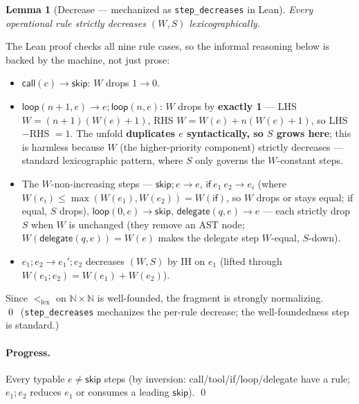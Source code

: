\documentclass[11pt]{article}
\theoremstyle{plain}
\newtheorem*{lemmaU}{Lemma}
\newcommand{\kw}[1]{\mathsf{#1}}                      %
\begin{document}
\begin{lemmaU}[Decrease --- mechanized as \texttt{step\_decreases} in Lean]
Every operational rule strictly decreases $(W, S)$ lexicographically.
\end{lemmaU}

The Lean proof checks all nine rule cases, so the informal reasoning below is backed by the
machine, not just prose:
\begin{itemize}
\item $\kw{call}(c) \to \kw{skip}$: $W$ drops $1 \to 0$.
\item $\kw{loop}(n+1, e) \to e ; \kw{loop}(n, e)$: $W$ drops by \textbf{exactly 1} --- LHS
  $W = (n+1)(W(e) + 1)$, RHS $W = W(e) + n (W(e) + 1)$, so LHS$-$RHS $= 1$. The unfold
  \textbf{duplicates $e$ syntactically, so $S$ grows here}; this is harmless because $W$ (the
  higher-priority component) strictly decreases --- standard lexicographic pattern, where $S$ only
  governs the $W$-constant steps.
\item The $W$-non-increasing steps --- $\kw{skip} ; e \to e$, $\kw{if}\ e_1\ e_2 \to e_i$ (where
  $W(e_i) \le \max(W(e_1), W(e_2)) = W(\kw{if})$, so $W$ drops or stays equal; if equal, $S$
  drops), $\kw{loop}(0, e) \to \kw{skip}$, $\kw{delegate}(q, e) \to e$ --- each strictly drop $S$
  when $W$ is unchanged (they remove an AST node; $W(\kw{delegate}(q, e)) = W(e)$ makes the
  delegate step $W$-equal, $S$-down).
\item $e_1 ; e_2 \to e_1' ; e_2$ decreases $(W, S)$ by IH on $e_1$ (lifted through
  $W(e_1 ; e_2) = W(e_1) + W(e_2)$).
\end{itemize}
Since $<_{\mathrm{lex}}$ on $\mathbb{N} \times \mathbb{N}$ is well-founded, the fragment is
strongly normalizing. \qed\ (\texttt{step\_decreases} mechanizes the per-rule decrease; the
well-foundedness step is standard.)

\paragraph{Progress.}
Every typable $e \neq \kw{skip}$ steps (by inversion: call/tool/if/loop/delegate have a rule;
$e_1 ; e_2$ reduces $e_1$ or consumes a leading $\kw{skip}$). \qed
\end{document}
